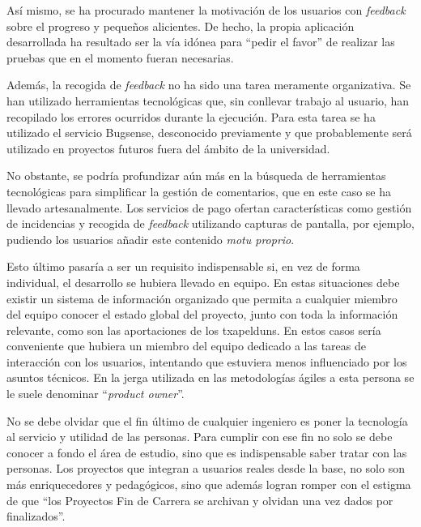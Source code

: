 \documentclass[main]{subfiles}
\begin{document}
Así mismo, se ha procurado mantener la motivación de los usuarios con \emph{feedback} sobre el progreso y pequeños alicientes. De hecho, la propia aplicación desarrollada ha resultado ser la vía idónea para \enquote{pedir el favor} de realizar las pruebas que en el momento fueran necesarias.

Además, la recogida de \emph{feedback} no ha sido una tarea meramente organizativa. Se han utilizado herramientas tecnológicas que, sin conllevar trabajo al usuario, han recopilado los errores ocurridos durante la ejecución. Para esta tarea se ha utilizado el servicio Bugsense, desconocido previamente y que probablemente será utilizado en proyectos futuros fuera del ámbito de la universidad.

No obstante, se podría profundizar aún más en la búsqueda de herramientas tecnológicas para simplificar la gestión de comentarios, que en este caso se ha llevado artesanalmente. Los servicios de pago ofertan características como gestión de incidencias y recogida de \emph{feedback} utilizando capturas de pantalla, por ejemplo, pudiendo los usuarios añadir este contenido \emph{motu proprio}.

Esto último pasaría a ser un requisito indispensable si, en vez de forma individual, el desarrollo se hubiera llevado en equipo. En estas situaciones debe existir un sistema de información organizado que permita a cualquier miembro del equipo conocer el estado global del proyecto, junto con toda la información relevante, como son las aportaciones de los \glspl{txapeldun}. En estos casos sería conveniente que hubiera un miembro del equipo dedicado a las tareas de interacción con los usuarios, intentando que estuviera menos influenciado por los asuntos técnicos. En la jerga utilizada en las metodologías ágiles a esta persona se le suele denominar \enquote{\emph{product owner}}.

No se debe olvidar que el fin último de cualquier ingeniero es poner la tecnología al servicio y utilidad de las personas. Para cumplir con ese fin no solo se debe conocer a fondo el área de estudio, sino que es indispensable saber tratar con las personas. Los proyectos que integran a usuarios reales desde la base, no solo son más enriquecedores y pedagógicos, sino que además logran romper con el estigma de que \enquote{los Proyectos Fin de Carrera se archivan y olvidan una vez dados por finalizados}.
\end{document}
